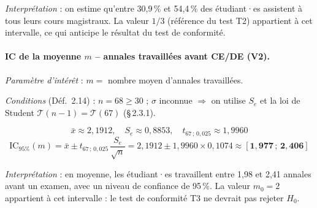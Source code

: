 \textit{Interprétation} : on estime qu'entre 30,9\,\% et 54,4\,\% des étudiant·es
assistent à tous leurs cours magistraux.
La valeur $1/3$ (référence du test T2) appartient à cet intervalle, ce qui
anticipe le résultat du test de conformité.

\paragraph{IC de la moyenne $m$ -- annales travaillées avant CE/DE (V2).}

\textit{Paramètre d'intérêt} : $m = $ nombre moyen d'annales travaillées.

\textit{Conditions} (Déf.~2.14) : $n = 68 \geq 30$ {\checkmark} ;
$\sigma$ inconnue $\Rightarrow$ on utilise $S_e$ et la loi de Student
$\mathcal{T}(n-1) = \mathcal{T}(67)$ (§\,2.3.1).

\[
  \bar{x} \approx 2{,}1912,\quad
  S_e \approx 0{,}8853,\quad
  t_{67\,;\,0{,}025} \approx 1{,}9960
\]
\[
  \text{IC}_{95\%}(m)
  = \bar{x} \pm t_{67\,;\,0{,}025}\,\frac{S_e}{\sqrt{n}}
  = 2{,}1912 \pm 1{,}9960 \times 0{,}1074
  \approx \boldsymbol{[1{,}977\,;\,2{,}406]}
\]

\textit{Interprétation} : en moyenne, les étudiant·es travaillent entre
1,98 et 2,41 annales avant un examen, avec un niveau de confiance de 95\,\%.
La valeur $m_0 = 2$ appartient à cet intervalle : le test de conformité T3
ne devrait pas rejeter $H_0$.
